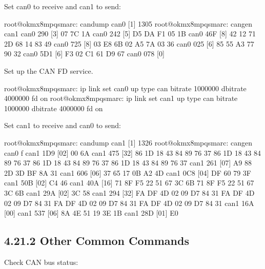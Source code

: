 \documentclass[letterpaper,10pt,openany,english]{sphinxmanual}
\begin{document}
\sphinxAtStartPar
Set can0 to receive and can1 to send:

\begin{sphinxVerbatim}[commandchars=\\\{\}]
root@ok\PYGZhy{}mx8mpq\PYGZhy{}smarc:\PYGZti{}\PYGZsh{} candump can0 \PYGZam{}
[1] 1305
root@ok\PYGZhy{}mx8mpq\PYGZhy{}smarc:\PYGZti{}\PYGZsh{} cangen  can1
  can0  290   [3]  07 7C 1A
  can0  242   [5]  D5 DA F1 05 1B
  can0  46F   [8]  42 12 71 2D 68 14 83 49
  can0  725   [8]  03 E8 6B 02 A5 7A 03 36
  can0  025   [6]  85 55 A3 77 90 32
  can0  5D1   [6]  F3 02 C1 61 D9 67
  can0  078   [0]
\end{sphinxVerbatim}

\sphinxAtStartPar
Set up the CAN FD service.

\begin{sphinxVerbatim}[commandchars=\\\{\}]
root@ok\PYGZhy{}mx8mpq\PYGZhy{}smarc:\PYGZti{}\PYGZsh{} ip link set can0 up type can bitrate 1000000 dbitrate 4000000 fd on
root@ok\PYGZhy{}mx8mpq\PYGZhy{}smarc:\PYGZti{}\PYGZsh{} ip link set can1 up type can bitrate 1000000 dbitrate 4000000 fd on
\end{sphinxVerbatim}

\sphinxAtStartPar
Set can1 to receive and can0 to send:

\begin{sphinxVerbatim}[commandchars=\\\{\}]
root@ok\PYGZhy{}mx8mpq\PYGZhy{}smarc:\PYGZti{}\PYGZsh{} candump can1 \PYGZam{}
[1] 1326
root@ok\PYGZhy{}mx8mpq\PYGZhy{}smarc:\PYGZti{}\PYGZsh{} cangen  can0 \PYGZhy{}f
  can1  1D9  [02]  00 6A
  can1  475  [32]  86 1D 18 43 84 89 76 37 86 1D 18 43 84 89 76 37 86 1D 18 43 84 89 76 37 86 1D 18 43 84 89 76 37
  can1  261  [07]  A9 88 2D 3D BF 8A 31
  can1  606  [06]  37 65 17 0B A2 4D
  can1  0C8  [04]  DF 60 79 3F
  can1  50B  [02]  C4 46
  can1  40A  [16]  71 8F F5 22 51 67 3C 6B 71 8F F5 22 51 67 3C 6B
  can1  29A  [02]  3C 58
  can1  294  [32]  FA DF 4D 02 09 D7 84 31 FA DF 4D 02 09 D7 84 31 FA DF 4D 02 09 D7 84 31 FA DF 4D 02 09 D7 84 31
  can1  16A  [00] 
  can1  537  [06]  8A 4E 51 19 3E 1B
  can1  28D  [01]  E0
\end{sphinxVerbatim}


\subsection{4.21.2 Other Common Commands}
\label{\detokenize{linux-manual:other-common-commands}}
\sphinxAtStartPar
Check CAN bus status:
\end{document}
